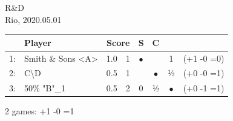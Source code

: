 \documentclass{scrartcl}
\begin{document}
\setlength{\parindent}{0cm}
\small
R\&D\\
Rio, 2020.05.01\\
\begin{longtable}{rlr@{/}rc@{ }c@{ }cr}
\toprule
  & \bfseries Player &  \multicolumn{2}{c}{\bfseries Score} &  \ttfamily S & \ttfamily C & \ttfamily 5 & \\
\midrule
\endhead
 1:  & Smith \& Sons \textless{}A\textgreater{}  &   1.0  &  1   & $\bullet$ &  & 1 &  (+1 -0 =0) \\
 2:  & C\textbackslash{}D               &   0.5  &  1   &  & $\bullet$ & ½ &  (+0 -0 =1) \\
 3:  & 50\% "B"\_1         &   0.5  &  2   & 0 & ½ & $\bullet$ &  (+0 -1 =1) \\
\bottomrule
\end{longtable}
2 games: +1 -0 =1
\end{document}
